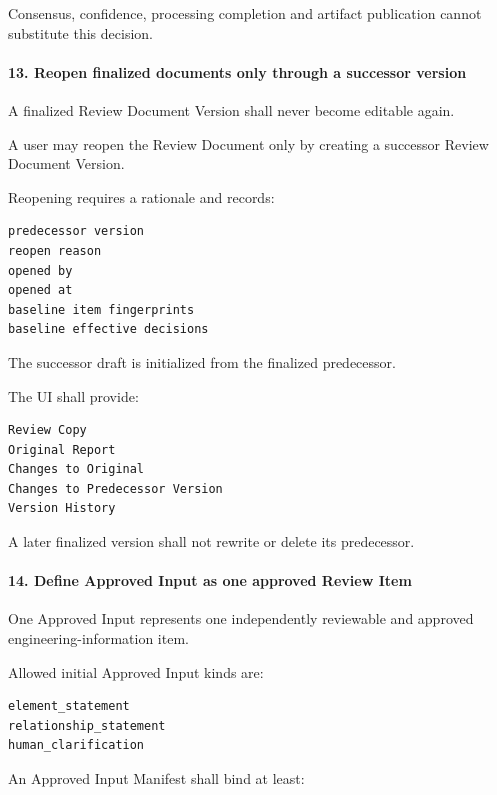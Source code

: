 Consensus, confidence, processing completion and artifact publication cannot substitute this decision.

\hypertarget{13-reopen-finalized-documents-only-through-a-successor-version}{%
\paragraph{13. Reopen finalized documents only through a successor version}\label{13-reopen-finalized-documents-only-through-a-successor-version}}

A finalized Review Document Version shall never become editable again.

A user may reopen the Review Document only by creating a successor Review Document Version.

Reopening requires a rationale and records:

\begin{verbatim}
predecessor version
reopen reason
opened by
opened at
baseline item fingerprints
baseline effective decisions
\end{verbatim}

The successor draft is initialized from the finalized predecessor.

The UI shall provide:

\begin{verbatim}
Review Copy
Original Report
Changes to Original
Changes to Predecessor Version
Version History
\end{verbatim}

A later finalized version shall not rewrite or delete its predecessor.

\hypertarget{14-define-approved-input-as-one-approved-review-item}{%
\paragraph{14. Define Approved Input as one approved Review Item}\label{14-define-approved-input-as-one-approved-review-item}}

One Approved Input represents one independently reviewable and approved engineering-information item.

Allowed initial Approved Input kinds are:

\begin{verbatim}
element_statement
relationship_statement
human_clarification
\end{verbatim}

An Approved Input Manifest shall bind at least:

